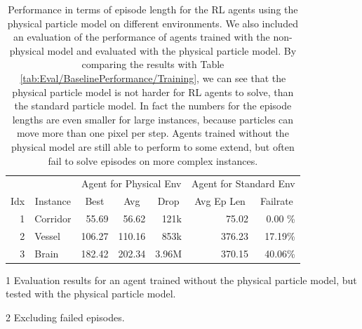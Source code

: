 \begin{table}[htp]
    \begin{center}
        \begin{threeparttable}
            \begin{tabular}{rlrrrrr}
                \toprule
                 &  & \multicolumn{3}{c}{Agent for Physical Env} & \multicolumn{2}{c}{Agent for Standard Env\tnote{1}} \\
                \cmidrule(lr){3-5} \cmidrule(lr){6-7}
                \multicolumn{1}{c}{Idx} & \multicolumn{1}{c}{Instance} & \multicolumn{1}{c}{Best} & \multicolumn{1}{c}{Avg} & \multicolumn{1}{c}{Drop} & \multicolumn{1}{c}{Avg Ep Len} & \multicolumn{1}{c}{Failrate} \\
                \midrule
                1 & Corridor & 55.69 & 56.62 & 121k & 75.02\tnote{2} & 0.00 \%\\
                2 & Vessel & 106.27 & 110.16 & 853k & 376.23\tnote{2} & 17.19\% \\
                3 & Brain & 182.42 & 202.34 & 3.96M & 370.15\tnote{2} & 40.06\% \\
                \bottomrule
            \end{tabular}
            \begin{tablenotes}
                \footnotesize
                \item[1] Evaluation results for an agent trained without the physical particle model, but tested with the physical particle model.
                \item[2] Excluding failed episodes.
            \end{tablenotes}
        \end{threeparttable}
        
    \end{center}
    \caption[Agent Performance on Environments with the Physical Particle Model]{Performance in terms of episode length for the RL agents using the physical particle model on different environments. We also included an evaluation of the performance of agents trained with the non-physical model and evaluated with the physical particle model. By comparing the results with Table \ref{tab:Eval/BaselinePerformance/Training}, we can see that the physical particle model is not harder for RL agents to solve, than the standard particle model. In fact the numbers for the episode lengths are even smaller for large instances, because particles can move more than one pixel per step. Agents trained without the physical model are still able to perform to some extend, but often fail to solve episodes on more complex instances.} \label{tab:Eval/Physical}
\end{table}

